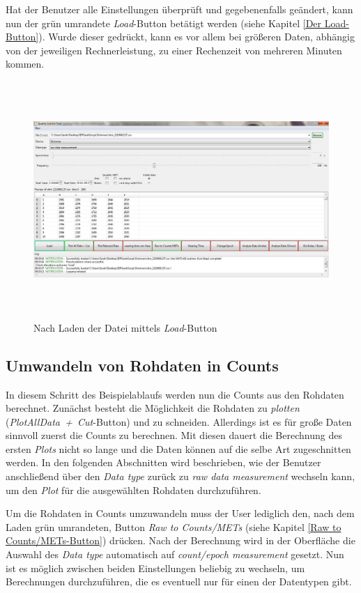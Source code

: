\documentclass[onecolumn,german]{article}
\begin{document}
Hat der Benutzer alle Einstellungen überprüft und gegebenenfalls geändert, kann nun der grün umrandete \textit{Load}-Button betätigt werden (siehe Kapitel \ref{Der Load-Button}). Wurde dieser gedrückt, kann es vor allem bei größeren Daten, abhängig von der jeweiligen Rechnerleistung, zu einer Rechenzeit von mehreren Minuten kommen.

\begin{figure}[H]
\centerline{
\includegraphics[width=160mm, height=90mm]{Abbildungen/Load.JPG}
}
\caption {Nach Laden der Datei mittels \textit{Load}-Button}
\label{load}
\end{figure}

\subsection{Umwandeln von Rohdaten in Counts}

In diesem Schritt des Beispielablaufs werden nun die Counts aus den Rohdaten berechnet. Zunächst besteht die Möglichkeit die Rohdaten zu \textit{plotten} \mbox{(\textit{PlotAllData + Cut}-Button)} und zu schneiden. Allerdings ist es für große Daten sinnvoll zuerst die Counts zu berechnen. Mit diesen dauert die Berechnung des ersten \textit{Plots} nicht so lange und die Daten können auf die selbe Art zugeschnitten werden. In den folgenden Abschnitten wird beschrieben, wie der Benutzer anschließend über den \textit{Data type} zurück zu \textit{raw data measurement} wechseln kann, um den \textit{Plot} für die ausgewählten Rohdaten durchzuführen.\newline

Um die Rohdaten in Counts umzuwandeln muss der User lediglich den, nach dem Laden grün umrandeten, Button \textit{Raw to Counts/METs} (siehe Kapitel \ref{Raw to Counts/METs-Button}) drücken. Nach der Berechnung wird in der Oberfläche die Auswahl des \textit{Data type} automatisch auf \textit{count/epoch measurement} gesetzt. Nun ist es möglich zwischen beiden Einstellungen beliebig zu wechseln, um Berechnungen durchzuführen, die es eventuell nur für einen der Datentypen gibt.\newline
\end{document}
